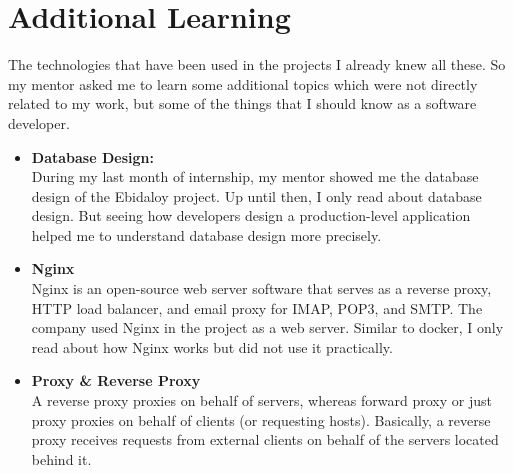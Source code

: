 \section{Additional Learning}
\begin{flushleft}
    The technologies that have been used in the projects I already knew all these. So my mentor
asked me to learn some additional topics which were not directly related to my work, but some
of the things that I should know as a software developer.
\begin{itemize}
    \item \textbf{Database Design:}\\
    \vspace{6pt}
During my last month of internship, my mentor showed me the database design of the
Ebidaloy project. Up until then, I only read about database design. But seeing how
developers design a production-level application helped me to understand database
design more precisely.
\item \textbf{Nginx}\\
\vspace{6pt}
Nginx is an open-source web server software that serves as a reverse proxy, HTTP load
balancer, and email proxy for IMAP, POP3, and SMTP. The company used Nginx in the
project as a web server. Similar to docker, I only read about how Nginx works but did not
use it practically.
\item \textbf{ Proxy \& Reverse Proxy}\\
\vspace{6pt}
A reverse proxy proxies on behalf of servers, whereas forward proxy or just proxy
proxies on behalf of clients (or requesting hosts). Basically, a reverse proxy receives
requests from external clients on behalf of the servers located behind it.
\end{itemize}



\end{flushleft}




